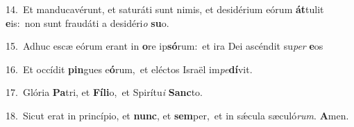 {\numbfont\textcolor{\numbcolor}{14.}}~Et manducavérunt, et saturáti sunt nimis, et desidérium eórum \textbf{át}\-tulit \textbf{e}\-is:~\star non sunt fraudáti a desidéri\textit{o} \textbf{su}\-o.\par
{\numbfont\textcolor{\numbcolor}{15.}}~Adhuc escæ eórum erant in \textbf{o}\-re ip\-\textbf{só}\-rum:~\star et ira Dei ascéndit su\textit{per} \textbf{e}\-os\par
{\numbfont\textcolor{\numbcolor}{16.}}~Et occídit \textbf{pin}\-gues e\-\textbf{ó}\-rum,~\star et eléctos Israël im\-\textit{pe}\-\textbf{dí}vit.\par
{\numbfont\textcolor{\numbcolor}{17.}}~Glória \textbf{Pa}\-tri, et \textbf{Fí}\-\textbf{li}o,~\star et Spirítu\textit{i} \textbf{Sanc}\-to.\par
{\numbfont\textcolor{\numbcolor}{18.}}~Sicut erat in princípio, et \textbf{nunc}\-, et \textbf{sem}\-per,~\star et in sǽcula sæculó\-\textit{rum}\-. \textbf{A}\-men.\par
